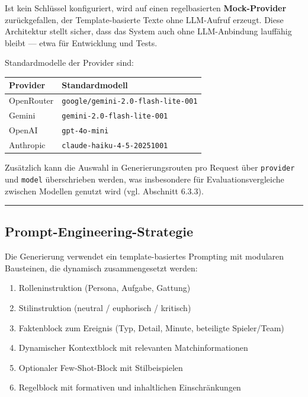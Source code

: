 Ist kein Schlüssel konfiguriert, wird auf einen regelbasierten
\textbf{Mock-Provider} zurückgefallen, der Template-basierte Texte ohne
LLM-Aufruf erzeugt. Diese Architektur stellt sicher, dass das System
auch ohne LLM-Anbindung lauffähig bleibt --- etwa für Entwicklung und
Tests.

Standardmodelle der Provider sind:

{\def\LTcaptype{none} %
\begin{longtable}[]{@{}ll@{}}
\toprule\noalign{}
Provider & Standardmodell \\
\midrule\noalign{}
\endhead
\bottomrule\noalign{}
\endlastfoot
OpenRouter & \texttt{google/gemini-2.0-flash-lite-001} \\
Gemini & \texttt{gemini-2.0-flash-lite-001} \\
OpenAI & \texttt{gpt-4o-mini} \\
Anthropic & \texttt{claude-haiku-4-5-20251001} \\
\end{longtable}
}

Zusätzlich kann die Auswahl in Generierungsrouten pro Request über
\texttt{provider} und \texttt{model} überschrieben werden, was
insbesondere für Evaluationsvergleiche zwischen Modellen genutzt wird
(vgl. Abschnitt 6.3.3).

\begin{center}\rule{0.5\linewidth}{0.5pt}\end{center}

\subsection{Prompt-Engineering-Strategie}\label{prompt-engineering-strategie}

Die Generierung verwendet ein template-basiertes Prompting mit modularen
Bausteinen, die dynamisch zusammengesetzt werden:

\begin{enumerate}
\def\labelenumi{\arabic{enumi}.}
\tightlist
\item
  Rolleninstruktion (Persona, Aufgabe, Gattung)
\item
  Stilinstruktion (neutral / euphorisch / kritisch)
\item
  Faktenblock zum Ereignis (Typ, Detail, Minute, beteiligte
  Spieler/Team)
\item
  Dynamischer Kontextblock mit relevanten Matchinformationen
\item
  Optionaler Few-Shot-Block mit Stilbeispielen
\item
  Regelblock mit formativen und inhaltlichen Einschränkungen
\end{enumerate}

